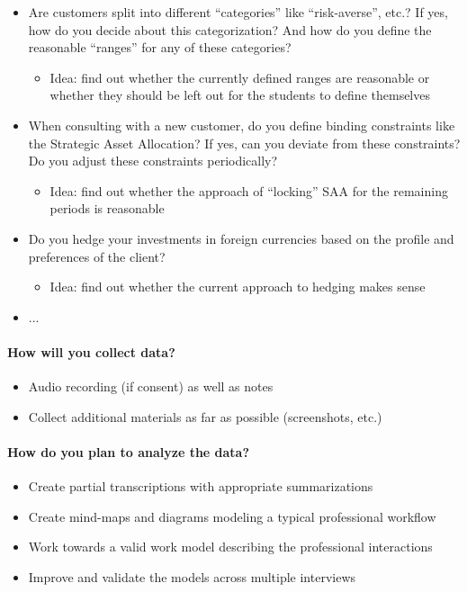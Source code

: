 \begin{itemize}
\begin{itemize}
  \end{itemize}
  \item Are customers split into different “categories” like “risk-averse”, etc.? If yes, how do you decide about this categorization? And how do you define the reasonable “ranges” for any of these categories?
  \begin{itemize}
    \item Idea: find out whether the currently defined ranges are reasonable or whether they should be left out for the students to define themselves
  \end{itemize}
  \item When consulting with a new customer, do you define binding constraints like the Strategic Asset Allocation? If yes, can you deviate from these constraints? Do you adjust these constraints periodically?
  \begin{itemize}
    \item Idea: find out whether the approach of “locking” SAA for the remaining periods is reasonable
  \end{itemize}
  \item Do you hedge your investments in foreign currencies based on the profile and preferences of the client?
  \begin{itemize}
    \item Idea: find out whether the current approach to hedging makes sense
  \end{itemize}
  \item ...
\end{itemize}

\paragraph{How will you collect data?}
\begin{itemize}
  \item Audio recording (if consent) as well as notes
  \item Collect additional materials as far as possible (screenshots, etc.)
\end{itemize}

\paragraph{How do you plan to analyze the data?}
\begin{itemize}
  \item Create partial transcriptions with appropriate summarizations
  \item Create mind-maps and diagrams modeling a typical professional workflow
  \item Work towards a valid work model describing the professional interactions
  \item Improve and validate the models across multiple interviews
\end{itemize}

